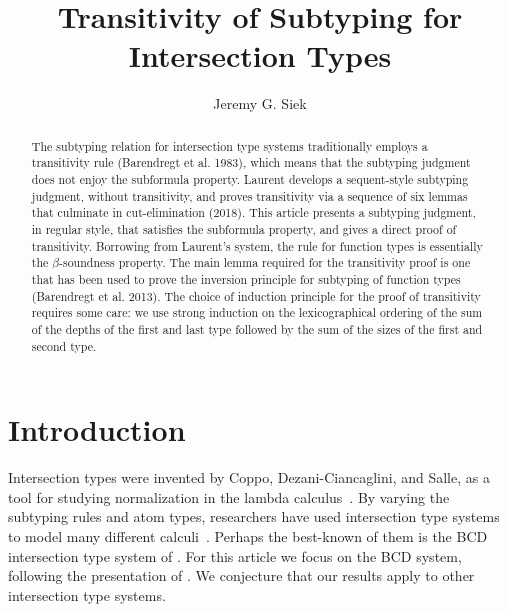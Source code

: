 \documentclass{article}
\title{Transitivity of Subtyping for Intersection Types}
\author{Jeremy G. Siek}
\begin{document}
\maketitle

\newcommand{\TOP}{\ensuremath{\mathtt{U}}}
\newcommand{\dom}[1]{\mathrm{dom}(#1)}
\newcommand{\cod}[1]{\mathrm{cod}(#1)}


\begin{abstract}
  The subtyping relation for intersection type systems traditionally
  employs a transitivity rule (Barendregt et al. 1983), which means
  that the subtyping judgment does not enjoy the subformula property.
  Laurent develops a sequent-style subtyping judgment, without
  transitivity, and proves transitivity via a sequence of six lemmas
  that culminate in cut-elimination (2018). This article presents a
  subtyping judgment, in regular style, that satisfies the subformula
  property, and gives a direct proof of transitivity. Borrowing from
  Laurent's system, the rule for function types is essentially the
  $\beta$-soundness property.  The main lemma required for the
  transitivity proof is one that has been used to prove the inversion
  principle for subtyping of function types (Barendregt et
  al. 2013). The choice of induction principle for the proof of
  transitivity requires some care: we use strong induction on the
  lexicographical ordering of the sum of the depths of the first and
  last type followed by the sum of the sizes of the first and second
  type.
\end{abstract}

\section{Introduction}

Intersection types were invented by Coppo, Dezani-Ciancaglini, and
Salle, as a tool for studying normalization in the lambda
calculus~\citep{Coppo:1979aa}. By varying the subtyping rules and atom
types, researchers have used intersection type systems to model many
different
calculi~\citep{Coppo:1980ab,Coppo:1981aa,Engeler:1981aa,Coppo:1984aa,Honsell:1992aa,Abramsky:1993fk,Plotkin:1993ab,Honsell:1999aa,Rocca:2004aa,Dezani-Ciancaglini:2005aa,Alessi:2006aa}.
Perhaps the best-known of them is the BCD intersection type system of
\citet{Barendregt:1983aa}. For this article we focus on the BCD
system, following the presentation of \citet{Barendregt:2013aa}.  We
conjecture that our results apply to other intersection type systems.
\end{document}

